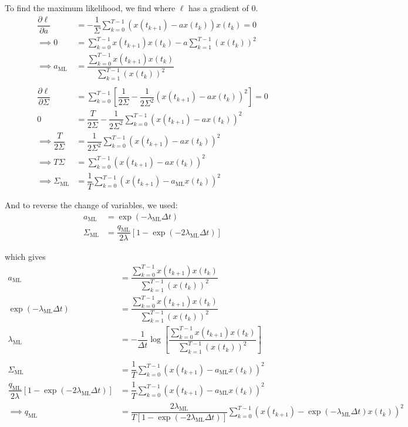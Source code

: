 \documentclass[]{article}
\begin{document}
To find the maximum likelihood, we find where \(\ell\) has a gradient of
0. \begin{align}
\dfrac{\partial \ell}{\partial a} &=
- \dfrac{1}{\Sigma} \sum_{k=0}^{T-1} \left( x(t_{k+1}) - a x(t_k) \right) x(t_k) = 0\\
\implies 0 &= \sum_{k=0}^{T-1} x(t_{k+1})x(t_k)  - a \sum_{k=1}^{T-1} \left(x(t_k)\right)^2\\
\implies  a_{\mathrm{ML}} &= \dfrac{\sum_{k=0}^{T-1} x(t_{k+1})x(t_k)}{\sum_{k=1}^{T-1} \left(x(t_k)\right)^2}\\
&\, \\
\dfrac{\partial \ell}{\partial \Sigma} &=
\sum_{k=0}^{T-1} \left[ \dfrac{1}{2 \Sigma} - \dfrac{1}{2 \Sigma^2} \left( x(t_{k+1}) - a x(t_k) \right)^2 \right] = 0\\
0 &= \dfrac{T}{2 \Sigma} - \dfrac{1}{2 \Sigma^2} \sum_{k=0}^{T-1} \left( x(t_{k+1}) - a x(t_k) \right)^2\\
\implies \dfrac{T}{2 \Sigma} &= \dfrac{1}{2 \Sigma^2} \sum_{k=0}^{T-1} \left( x(t_{k+1}) - a x(t_k) \right)^2\\
\implies T \Sigma &= \sum_{k=0}^{T-1} \left( x(t_{k+1}) - a x(t_k) \right)^2\\
\implies \Sigma_{\mathrm{ML}} &= \dfrac{1}{T} \sum_{k=0}^{T-1} \left( x(t_{k+1}) - a_{\mathrm{ML}} x(t_k) \right)^2
\end{align}

And to reverse the change of variables, we used: \begin{align}
a_{\mathrm{ML}} &= \exp{\left( - \lambda_{\mathrm{ML}} \Delta t \right)}\\
\Sigma_{\mathrm{ML}} &= \dfrac{q_{\mathrm{ML}}}{2 \lambda} \left[ 1 - \exp{\left( - 2 \lambda_{\mathrm{ML}} \Delta t \right)} \right]
\end{align}

which gives \begin{align}
a_{\mathrm{ML}} &= \dfrac{\sum_{k=0}^{T-1} x(t_{k+1})x(t_k)}{\sum_{k=1}^{T-1} \left(x(t_k)\right)^2}\\
\exp{\left( - \lambda_{\mathrm{ML}} \Delta t \right)} &= \dfrac{\sum_{k=0}^{T-1} x(t_{k+1})x(t_k)}{\sum_{k=1}^{T-1} \left(x(t_k)\right)^2}\\
\lambda_{\mathrm{ML}} &= - \dfrac{1}{\Delta t} \log{\left[ \dfrac{\sum_{k=0}^{T-1} x(t_{k+1})x(t_k)}{\sum_{k=1}^{T-1} \left(x(t_k)\right)^2} \right]}\\
&\, \\
\Sigma_{\mathrm{ML}} &= \dfrac{1}{T} \sum_{k=0}^{T-1} \left( x(t_{k+1}) - a_{\mathrm{ML}} x(t_k) \right)^2\\
\dfrac{q_{\mathrm{ML}}}{2 \lambda} \left[ 1 - \exp{\left( - 2 \lambda_{\mathrm{ML}} \Delta t \right)} \right]
&= \dfrac{1}{T} \sum_{k=0}^{T-1} \left( x(t_{k+1}) - a_{\mathrm{ML}} x(t_k) \right)^2\\
\implies q_{\mathrm{ML}} &= \dfrac{2 \lambda_{\mathrm{ML}}}{T \left[ 1 - \exp{\left( - 2 \lambda_{\mathrm{ML}} \Delta t \right)} \right]}
\sum_{k=0}^{T-1} \left( x(t_{k+1}) - \exp{\left( - \lambda_{\mathrm{ML}} \Delta t \right)} x(t_k) \right)^2
\end{align}
\end{document}

